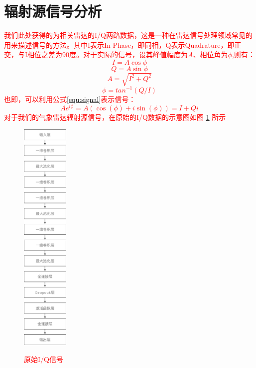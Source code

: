 \section{辐射源信号分析}
\textcolor{red}{我们此处获得的为相关雷达的I/Q两路数据，这是一种在雷达信号处理领域常见的用来描述信号的方法。其中I表示In-Phase，即同相，Q表示Quadrature，即正交，与I相位之差为90度。对于实际的信号，设其峰值幅度为$A$、相位角为$\phi$,则有：
\begin{equation}
	I = A\cos{\phi}
\end{equation}
\begin{equation}
	Q = A\sin{\phi}
\end{equation}
\begin{equation}
	A=\sqrt{I^2+Q^2}
\end{equation}
\begin{equation}
	\phi=tan^{-1}(Q/I)
\end{equation}
也即，可以利用公式\ref{equ:signal}表示信号：
\begin{equation}
	Ae^{i\phi}=A(\cos(\phi) + i\sin(\phi))=I+Qi
	\label{equ:signal}
\end{equation}
对于我们的气象雷达辐射源信号，在原始的I/Q数据的示意图如图 \ref{fig:IQ} 所示
\begin{figure}
	\centering
	\includegraphics[width=0.2\textwidth]{figures/struct_emitter.pdf}
	\label{fig:IQ}
	\caption{原始I/Q信号}
\end{figure}
}

